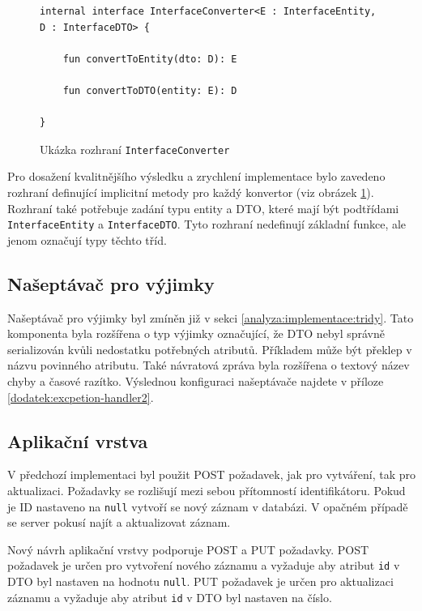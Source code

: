         
        \begin{figure} %
            \begin{verbatim}
internal interface InterfaceConverter<E : InterfaceEntity, D : InterfaceDTO> {

    fun convertToEntity(dto: D): E

    fun convertToDTO(entity: E): D

}
            \end{verbatim}
            \caption{Ukázka rozhraní \texttt{InterfaceConverter}} 
            \label{code:interface-converterl}
        \end{figure}
        Pro dosažení kvalitnějšího výsledku a zrychlení implementace bylo zavedeno rozhraní definující implicitní metody pro každý konvertor (viz obrázek \ref{code:interface-converterl}). Rozhraní také potřebuje zadání typu entity a DTO, které mají být podtřídami \verb|InterfaceEntity| a \verb|InterfaceDTO|. Tyto rozhraní nedefinují základní funkce, ale jenom označují typy těchto tříd. 
        
    \subsection{Našeptávač pro výjimky}
        Našeptávač pro výjimky byl zmíněn již v sekci \ref{analyza:implementace:tridy}. Tato komponenta byla rozšířena o typ výjimky označující, že DTO nebyl správně serializován kvůli nedostatku potřebných atributů. Příkladem může být překlep v názvu povinného atributu. Také návratová zpráva byla rozšířena o textový název chyby a časové razítko. Výslednou konfiguraci našeptávače najdete v příloze \ref{dodatek:excpetion-handler2}.
        
    \subsection{Aplikační vrstva}
        V předchozí implementaci byl použit POST požadavek, jak pro vytváření, tak pro aktualizaci. Požadavky se rozlišují mezi sebou přítomností identifikátoru. Pokud je ID nastaveno na \verb|null| vytvoří se nový záznam v databázi. V opačném případě se server pokusí najít a aktualizovat záznam.
        
        
        Nový návrh aplikační vrstvy podporuje POST a PUT požadavky. POST požadavek je určen pro vytvoření nového záznamu a vyžaduje aby atribut \verb|id| v DTO byl nastaven na hodnotu \verb|null|. PUT požadavek je určen pro aktualizaci záznamu a vyžaduje aby atribut \verb|id| v DTO byl nastaven na číslo.
        
